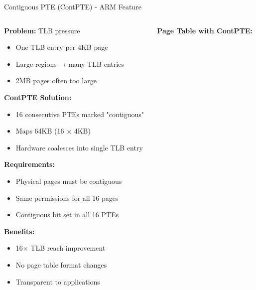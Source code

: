 \documentclass[aspectratio=169,12pt]{beamer}
\begin{document}
\begin{frame}{Contiguous PTE (ContPTE) - ARM Feature}
\begin{columns}[T]
\begin{column}{0.45\textwidth}
\textbf{Problem:} TLB pressure
\begin{itemize}
\item One TLB entry per 4KB page
\item Large regions → many TLB entries
\item 2MB pages often too large
\end{itemize}

\textbf{ContPTE Solution:}
\begin{itemize}
\item 16 consecutive PTEs marked "contiguous"
\item Maps 64KB (16 × 4KB)
\item Hardware coalesces into single TLB entry
\end{itemize}

\textbf{Requirements:}
\begin{itemize}
\item Physical pages must be contiguous
\item Same permissions for all 16 pages
\item Contiguous bit set in all 16 PTEs
\end{itemize}

\textbf{Benefits:}
\begin{itemize}
\item 16× TLB reach improvement
\item No page table format changes
\item Transparent to applications
\end{itemize}
\end{column}

\begin{column}{0.55\textwidth}
\textbf{Page Table with ContPTE:}
\begin{center}
\end{center}
\end{column}
\end{columns}
\end{frame}
\end{document}
